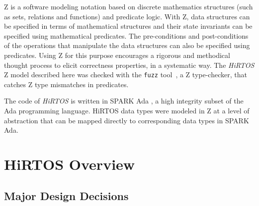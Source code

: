 \documentclass[11pt,letterpaper,twoside,openany]{book}
\begin{document}
Z is a software modeling notation based on discrete mathematics structures (such as sets,
relations and functions) and predicate logic. With Z, data structures can be specified in
terms of mathematical structures and their state invariants can be specified using mathematical
predicates. The pre-conditions and post-conditions of the operations that manipulate
the data structures can also be specified using predicates. Using Z for this purpose encourages
a rigorous and methodical thought process to elicit correctness properties, in a systematic way.
The \emph{HiRTOS} Z model described here was checked with the \verb'fuzz' tool~\cite{Fuzz}, a
Z type-checker, that catches Z type mismatches in predicates.

The code of \emph{HiRTOS} is written in SPARK Ada \cite{SparkAda}, a high integrity
subset of the Ada programming language. HiRTOS data types were modeled in Z at a level of
abstraction that can be mapped directly to corresponding data types in SPARK Ada.

\chapter{HiRTOS Overview}

\section{Major Design Decisions}
\end{document}
